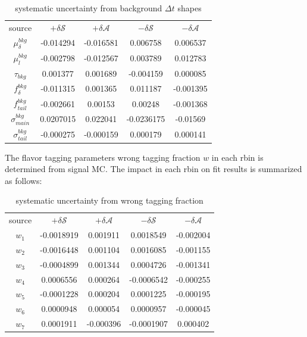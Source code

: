\begin{table}[H]
	\begin{minipage}[b]{1.0\linewidth}
		\centering
		\caption{systematic uncertainty from background $\Delta t$ shapes}
		\begin{tabular}{c c c c c}
			\hline
			source & $+\delta \mathcal{S}$ & $+\delta \mathcal{A}$ & $-\delta \mathcal{S}$ &  $-\delta \mathcal{A}$\\
			$\mu^{bkg}_{\delta}$ & -0.014294
			& -0.016581
			& 0.006758
			& 0.006537
			\\
			$\mu^{bkg}_{l}$&  -0.002798
			& -0.012567
			& 0.003789
			& 0.012783
			\\
			$\tau_{bkg}$ & 0.001377
			& 0.001689
			& -0.004159
			& 0.000085\\
			$f_{\delta}^{bkg}$ &  -0.011315
			& 0.001365
			& 0.011187
			& -0.001395
			\\
			$f^{bkg}_{tail}$  &-0.002661
			& 0.00153
			& 0.00248
			& -0.001368
			\\
			$\sigma^{bkg}_{main}$ & 0.0207015
			& 0.022041
			& -0.0236175
			& -0.01569
			\\
			$\sigma^{bkg}_{tail}$ & -0.000275 & -0.000159
			& 0.000179
			& 0.000141
			\\
			\hline
		\end{tabular}
	\end{minipage}
\end{table}
The flavor tagging parameters wrong tagging fraction $ w$ in each rbin is determined from signal MC. The impact in each rbin on fit results is summarized as follows: 
\begin{table}[H]
	\begin{minipage}[b]{1.0\linewidth}
		\centering
		\caption{systematic uncertainty from wrong tagging fraction}
		\begin{tabular}{c c c c c}
			\hline
			source & $+\delta \mathcal{S}$ & $+\delta \mathcal{A}$ & $-\delta \mathcal{S}$ &  $-\delta \mathcal{A}$\\
			$w_1$ & -0.0018919
			& 0.001911
			& 0.0018549
			& -0.002004
			\\
			$ w_2$ & -0.0016448
			& 0.001104
			& 0.0016085
			& -0.001155
			\\
			$ w_3$ & -0.0004899
			& 0.001344
			& 0.0004726
			& -0.001341
			\\
			$ w_4$ & 0.0006556
			& 0.000264
			& -0.0006542
			& -0.000255 \\
			$ w_5$ & -0.0001228
			& 0.000204
			& 0.0001225 &
			-0.000195
			\\
			$ w_6$ & 0.0000948 & 0.000054 & 0.0000957 & -0.000045 \\
			$ w_7$ & 0.0001911
			& -0.000396
			& -0.0001907
			& 0.000402
			\\
			\hline
		\end{tabular}
	\end{minipage}
\end{table}
